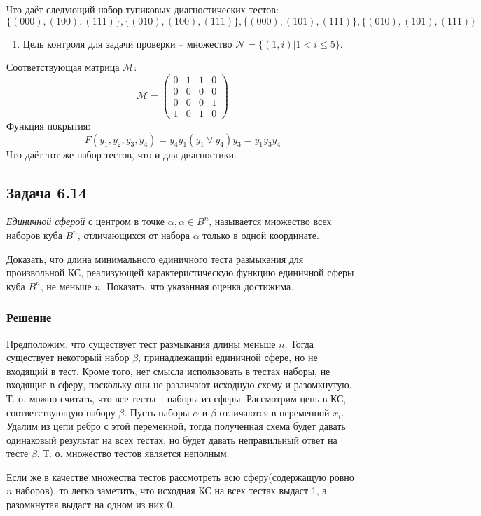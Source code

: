 \documentclass[11pt]{article}
\newcounter{th}\setcounter{th}{0}
\begin{document}
Что даёт следующий набор тупиковых диагностических тестов:
$$\{(000), (100), (111)\}, \{(010), (100), (111)\}, \{(000), (101), (111)\}, \{(010), (101), (111)\}$$
\begin{enumerate}
\item Цель контроля для задачи проверки -- множество \(\mathcal{N} = \{(1, i) | 1 < i \leq 5\}\).
\end{enumerate}
Соответствующая матрица \(\mathcal{M}\):
\begin{equation*}
\mathcal{M} = \begin{pmatrix}
0 & 1 & 1 & 0 \\
0 & 0 & 0 & 0 \\
0 & 0 & 0 & 1 \\
1 & 0 & 1 & 0
\end{pmatrix}
\end{equation*}
Функция покрытия:
\begin{equation*}
F(y_1, y_2, y_3, y_4) = y_4y_1(y_1\lor y_4)y_3 = y_1y_3y_4
\end{equation*}
Что даёт тот же набор тестов, что и для диагностики.
\subsection{Задача 6.14}
\label{sec:org573c93c}
\emph{Единичной сферой} с центром в точке \(\alpha, \alpha \in B^n\), называется множество всех
наборов куба \(B^n\), отличающихся от набора \(\alpha\) только в одной координате.

Доказать, что длина минимального единичного теста размыкания для произвольной КС, реализующей
характеристическую функцию единичной сферы куба \(B^n\), не меньше \(n\). Показать, что указанная
оценка достижима.
\subsubsection{Решение}
\label{sec:orga10b365}
Предположим, что существует тест размыкания длины меньше \(n\). Тогда существует некоторый набор
\(\beta\), принадлежащий единичной сфере, но не входящий в тест. Кроме того, нет смысла
использовать в тестах наборы, не входящие в сферу, поскольку они не различают исходную схему
и разомкнутую. Т. о. можно считать, что все тесты -- наборы из сферы. Рассмотрим цепь в КС,
соответствующую набору \(\beta\). Пусть наборы \(\alpha\) и \(\beta\) отличаются в переменной \(x_i\).
Удалим из цепи ребро с этой переменной, тогда полученная схема будет давать одинаковый
результат на всех тестах, но будет давать неправильный ответ на тесте \(\beta\). Т. о. множество
тестов является неполным.

Если же в качестве множества тестов рассмотреть всю сферу(содержащую ровно \(n\) наборов), то
легко заметить, что исходная КС на всех тестах выдаст 1, а разомкнутая выдаст на одном из них 0.
\end{document}
